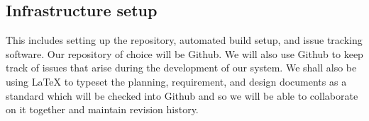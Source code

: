 \subsection{Infrastructure setup}
This includes setting up the repository, automated build setup, and issue tracking software. Our repository of choice will be Github. We will also use Github to keep track of issues that arise during the development of our system. We shall also be using LaTeX to typeset the planning, requirement, and design documents as a standard which will be checked into Github and so we will be able to collaborate on it together and maintain revision history.
